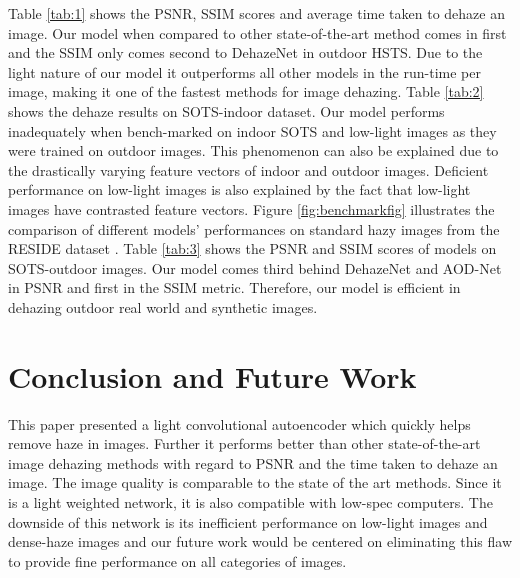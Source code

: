 \documentclass[conference]{IEEEtran}
\begin{document}
Table \ref{tab:1} shows the PSNR, SSIM scores and average time taken to dehaze an image. Our model when compared to other state-of-the-art method \cite{5567108, 5459251, Meng_2013_ICCV, 10.1007/978-3-319-46475-6_36, Berman_2016_CVPR, 7539399, 10.1007/978-3-319-46475-6_10, Li_2017_ICCV, 8803478} comes in first and the SSIM only comes second to DehazeNet \cite{7539399} in outdoor HSTS. Due to the light nature of our model it outperforms all other models in the run-time per image, making it one of the fastest methods for image dehazing. 
\newline
\newline
Table \ref{tab:2} shows the dehaze results on SOTS-indoor dataset. Our model performs inadequately when bench-marked on indoor SOTS and low-light images as they were trained on outdoor images. This phenomenon can also be explained due to the drastically varying feature vectors of indoor and outdoor images. Deficient performance on low-light images is also explained by the fact that low-light images have contrasted feature vectors. Figure \ref{fig:benchmarkfig} illustrates the comparison of different models' performances on standard hazy images from the RESIDE dataset \cite{li2019benchmarking}.
\newline
\newline
Table \ref{tab:3} shows the PSNR and SSIM scores of models \cite{5567108, 5459251, Meng_2013_ICCV, 10.1007/978-3-319-46475-6_36, Berman_2016_CVPR, 7539399, 10.1007/978-3-319-46475-6_10, Li_2017_ICCV} on SOTS-outdoor images. Our model comes third behind DehazeNet \cite{7539399} and AOD-Net \cite{Li_2017_ICCV} in PSNR and first in the SSIM metric. Therefore, our model is efficient in dehazing outdoor real world and synthetic images. 
\section{Conclusion and Future Work}This paper presented a light convolutional autoencoder which quickly helps remove haze in images. Further it performs better than other state-of-the-art image dehazing methods with regard to PSNR and the time taken to dehaze an image. The image quality is comparable to the state of the art methods. Since it is a light weighted network, it is also compatible with low-spec computers. The downside of this network is its inefficient performance on low-light images and dense-haze images and our future work would be centered on eliminating this flaw to provide fine performance on all categories of images. 
\nocite{*}


\end{document}
